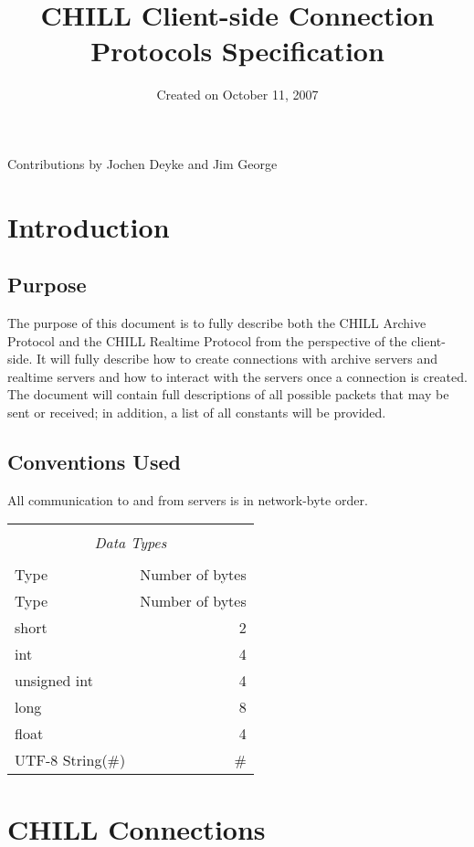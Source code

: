 \documentclass[10pt]{article}
\title{CHILL Client-side Connection Protocols Specification}
\date{Created on October 11, 2007}
\newcommand{\tblspc}{\rule{0pt}{3ex}}
\begin{document}
\maketitle
\begin{center}
Contributions by Jochen Deyke and Jim George
\end{center}
\newpage
\tableofcontents
\newpage

\section{Introduction}
\subsection{Purpose}
The purpose of this document is to fully describe both the CHILL Archive Protocol and the CHILL Realtime Protocol from the perspective of the client-side. It will fully describe how to create connections with archive servers and realtime servers and how to interact with the servers once a connection is created. The document will contain full descriptions of all possible packets that may be sent or received; in addition, a list of all constants will be provided.

\subsection{Conventions Used}
All communication to and from servers is in network-byte order.

\begin{longtable}{|l|r|}
\hline
\multicolumn{2}{|c|}{} \\
\multicolumn{2}{|c|}{\emph{Data Types}} \\
\multicolumn{2}{|c|}{} \\
\hline Type & Number of bytes \\ \hline \endfirsthead
\hline Type & Number of bytes \\ \hline \endhead
\hline \endfoot
\tblspc short & 2 \\
\hline
\tblspc int & 4 \\
\hline
\tblspc unsigned int & 4 \\
\hline
\tblspc long & 8 \\
\hline
\tblspc float & 4 \\
\hline
\tblspc UTF-8 String(\#) & \# \\
\hline
\end{longtable}


\section{CHILL Connections}
\end{document}
